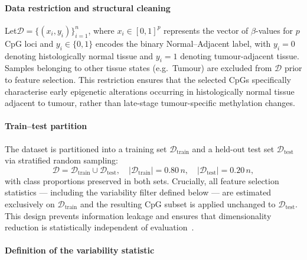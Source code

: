 \paragraph{Data restriction and structural cleaning}

Let$\mathcal{D} = \{(x_i, y_i)\}_{i=1}^{n}$,
where $x_i \in [0,1]^p$ represents the vector of $\beta$-values 
for $p$ CpG loci and $y_i \in \{0,1\}$ encodes the binary 
Normal--Adjacent label, with $y_i = 0$ denoting histologically 
normal tissue and $y_i = 1$ denoting tumour-adjacent tissue. 
Samples belonging to other tissue states (e.g.\ Tumour) are 
excluded from $\mathcal{D}$ prior to feature selection. 
This restriction ensures that the selected CpGs specifically 
characterise early epigenetic alterations occurring in 
histologically normal tissue adjacent to tumour, rather than 
late-stage tumour-specific methylation changes.

\paragraph{Train--test partition}

The dataset is partitioned into a training set 
$\mathcal{D}_{\mathrm{train}}$ and a held-out test set 
$\mathcal{D}_{\mathrm{test}}$ via stratified random sampling:
\begin{equation}
    \mathcal{D} = \mathcal{D}_{\mathrm{train}} \cup 
    \mathcal{D}_{\mathrm{test}}, 
    \quad 
    |\mathcal{D}_{\mathrm{train}}| = 0.80\,n, 
    \quad 
    |\mathcal{D}_{\mathrm{test}}| = 0.20\,n,
    \label{eq:split}
\end{equation}
with class proportions preserved in both sets. Crucially, 
all feature selection statistics — including the variability 
filter defined below — are estimated exclusively on 
$\mathcal{D}_{\mathrm{train}}$ and the resulting CpG subset 
is applied unchanged to $\mathcal{D}_{\mathrm{test}}$. This 
design prevents information leakage and ensures that 
dimensionality reduction is statistically independent of 
evaluation~\cite{Ambroise2002}.

\paragraph{Definition of the variability statistic}

